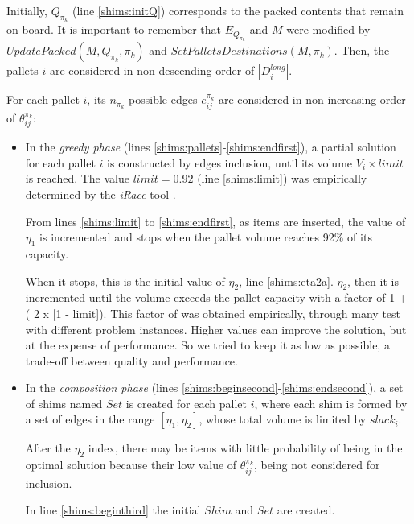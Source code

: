 \documentclass[preprint]{elsarticle}
\begin{document}
Initially, $Q_{\pi_k}$\/ (line \ref{shims:initQ}) corresponds to the packed contents that remain on board. It is important to remember that $E_{Q_{\pi_k}}$\/ and $M$\/ were modified by $UpdatePacked(M, Q_{\pi_k}, \pi_k)$ and $SetPalletsDestinations(M, \pi_k)$. Then, the pallets $i$\/ are considered in non-descending order of $|D_i^{long}|$. 

For each pallet $i$, its $n_{\pi_k}$\/ possible edges $e_{ij}^{\pi_k}$\/ are considered in non-increasing order of $\theta_{ij}^{\pi_k}$:

{\color{blue}
	
\begin{itemize}
	

	
	\item In the {\it greedy phase}\/ (lines \ref{shims:pallets}-\ref{shims:endfirst}), a partial solution for each pallet $i$\/ is constructed by edges inclusion, until its volume $V_i \times limit$\/ is reached. The value $limit=0.92$\/ (line \ref{shims:limit}) was empirically determined by the {\it iRace} tool \cite{LopezIbanezManuel2016}.
	
	From lines \ref{shims:limit} to \ref{shims:endfirst}, as items are inserted, the value of $\eta_1$ is incremented and stops when the pallet volume reaches 92\% of its capacity.

	When it stops, this is the initial value of $\eta_2$, line \ref{shims:eta2a}.
	$\eta_2$, then it is incremented until the volume exceeds the pallet capacity with a factor of 1 + ( 2 x [1 - limit]).
	This factor of was obtained empirically, through many test with different problem instances.
	Higher values can improve the solution, but at the expense of performance. So we tried to keep it as low as possible, a trade-off between quality and performance.
	
	\item In the {\it composition phase}\/ (lines \ref{shims:beginsecond}-\ref{shims:endsecond}), a set of shims named $Set$\/ is created for each pallet $i$, where each shim is formed by a set of edges in the range $[\eta_1,\eta_2]$, whose total volume is limited by $slack_i$.
		
	After the $\eta_2$ index, there may be items with little probability of being in the optimal solution because their low value of $\theta^{\pi_k}_{ij}$, being not considered for inclusion.
	
	In line \ref{shims:beginthird} the initial $Shim$ and $Set$ are created.
	

\end{itemize}}
\end{document}
